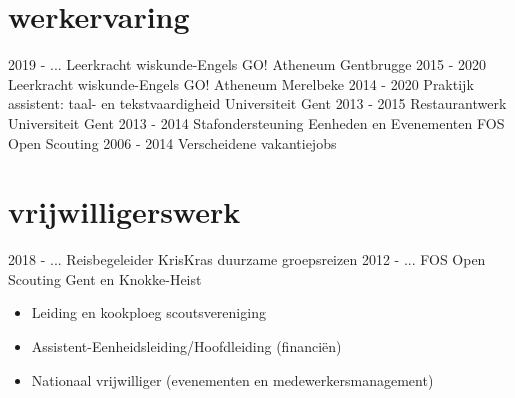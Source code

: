 \documentclass[]{friggeri-cv}
\begin{document}
\section{werkervaring}
\begin{entrylist}
  \vspace{-2.5mm}
  \entry
    {2019 - ...}
    {Leerkracht wiskunde-Engels}
    {GO! Atheneum Gentbrugge}
    {}
  \vspace{-2.5mm}
  \entry
    {2015 - 2020}
    {Leerkracht wiskunde-Engels}
    {GO! Atheneum Merelbeke}
    {}
  \vspace{-2.5mm}
  \entry
    {2014 - 2020}
    {Praktijk assistent: taal- en tekstvaardigheid}
    {Universiteit Gent}
    {}
  \vspace{-2.5mm}
  \entry
    {2013 - 2015}
    {Restaurantwerk}
    {Universiteit Gent}
    {}
  \vspace{-2.5mm}
  \entry
    {2013 - 2014}
    {Stafondersteuning Eenheden en Evenementen}
    {FOS Open Scouting}
    {}
  \vspace{-2.5mm}
  \entry
    {2006 - 2014}
    {Verscheidene vakantiejobs}
    {}
    {}
\end{entrylist}

\section{vrijwilligerswerk}
\begin{entrylist}
    \entry
    {2018 - ...}
    {Reisbegeleider}
    {KrisKras}
    {duurzame groepsreizen}
  \entry
    {2012 - ...}
    {FOS Open Scouting}
    {Gent en Knokke-Heist}
    {\vspace{-0.25cm}\begin{itemize}
      \item Leiding en kookploeg scoutsvereniging
      \item Assistent-Eenheidsleiding/Hoofdleiding (financi\"en)
      \item Nationaal vrijwilliger (evenementen en medewerkersmanagement)
    \end{itemize}}
\end{entrylist}
\end{document}

